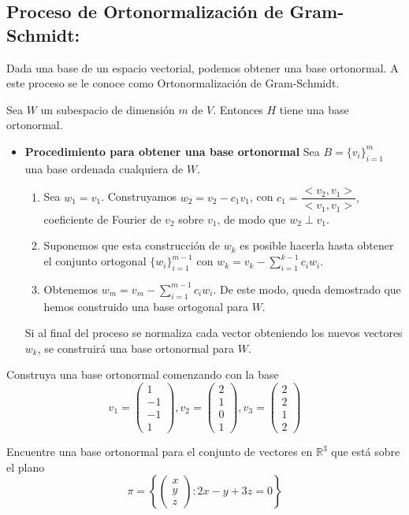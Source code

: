 
\subsection{Proceso de Ortonormalización de Gram-Schmidt: }
Dada una base de un espacio vectorial, podemos obtener una base ortonormal. A este proceso se le conoce como Ortonormalización de Gram-Schmidt.

Sea $W$ un subespacio de dimensión $m$ de $V$. Entonces $H$ tiene una base ortonormal.

\begin{itemize}

\item
\textbf{Procedimiento para obtener una base ortonormal}
Sea $B = \{v_i\}_{i=1}^m $ una base ordenada cualquiera de $W $.
\begin{enumerate}
\item Sea $w_1 = v_1$. Construyamos $w_2 = v_2 - c_1v_1$, con $c_1 =\dfrac{<v_2,v_1>}{<v_1,v_1>}, $ coeficiente de Fourier de $v_2$ sobre $v_1$, de modo que $w_2 \perp v_1$.
\item Suponemos que esta construcción de $w_k$ es posible hacerla hasta
obtener el conjunto ortogonal $ \{w_i\}_{i=1}^{m-1}$ con $w_k=v_k-\sum_{i=1}^{k-1}c_iw_i$.
\item Obtenemos $w_m=v_m-\sum_{i=1}^{m-1}c_iw_i$.
De este modo, queda demostrado que hemos construido una base ortogonal
para $W$.

\end{enumerate}
Si al final del proceso se normaliza cada vector obteniendo los nuevos
vectores $w_k$, se construirá una base ortonormal para $W$.
\end{itemize}








\begin{ejem}Construya una base ortonormal comenzando con la base 
$$v_1 = \begin{pmatrix} 1 \\ -1 \\ -1 \\ 1 \end{pmatrix}, v_2 = \begin{pmatrix} 2 \\ 1 \\ 0 \\ 1 \end{pmatrix}, v_3 = \begin{pmatrix} 2 \\ 2 \\ 1 \\ 2 \end{pmatrix}  $$
\end{ejem}

\begin{ejem} Encuentre una base ortonormal para el conjunto de vectores en $\mathbb{R}^3$ que está sobre el plano 
$$\pi = \left\{ \begin{pmatrix} x \\ y \\ z \end{pmatrix}: 2x-y+3z=0 \right\}$$
\end{ejem}